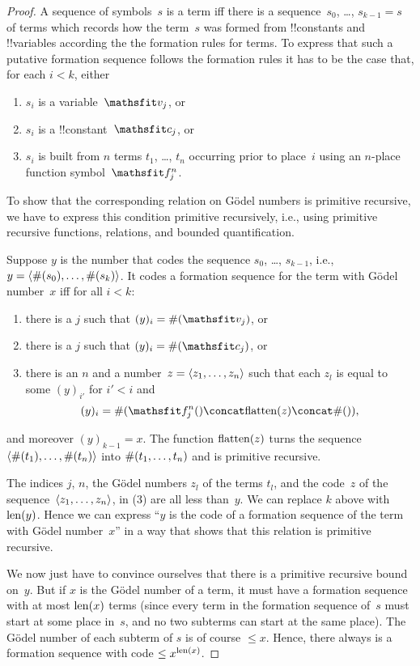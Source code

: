 \documentclass[../../include/open-logic-section]{subfiles}
\begin{document}
\begin{proof}
A sequence of symbols~$s$ is a term iff there is a sequence~$s_0$,
\dots, $s_{k-1} = s$ of terms which records how the term~$s$ was formed
from !!{constant}s and !!{variable}s according the the formation rules
for terms. To express that such a putative formation sequence follows
the formation rules it has to be the case that, for each $i < k$, either
\begin{enumerate}
\item $s_i$ is a variable~$\Obj v_j$, or
\item $s_i$ is a !!{constant}~$\Obj c_j$, or
\item $s_i$ is built from $n$ terms $t_1$, \dots, $t_n$ occurring
  prior to place~$i$ using an $n$-place function symbol~$\Obj f^n_j$.
\end{enumerate}
To show that the corresponding relation on G\"odel numbers is
primitive recursive, we have to express this condition primitive
recursively, i.e., using primitive recursive functions, relations, and
bounded quantification.

Suppose $y$ is the number that codes the sequence $s_0$, \dots, $s_{k-1}$,
i.e., $y = \langle \#(s_0), \dots, \#(s_k) \rangle$.  It codes a formation
sequence for the term with G\"odel number~$x$ iff for all $i < k$:
\begin{enumerate}
\item there is a $j$ such that $(y)_i = \Gn{\Obj v_j}$, or
\item there is a $j$ such that $(y)_i = \Gn{\Obj c_j}$, or
\item there is an $n$ and a number~$z = \langle z_1, \dots, z_n \rangle$ such
  that each $z_l$ is equal to some $(y)_{i'}$ for $i' < i$ and
\[
(y)_i = \Gn{\Obj f^n_j(} \concat \fn{flatten}(z) \concat \Gn{)},
\]
\end{enumerate}
and moreover $(y)_{k-1} = x$.  The function
$\mathrm{flatten}(z)$ turns the sequence $\langle \#(t_1), \dots,
  \#(t_n) \rangle$ into $\#(t_1, \dots, t_n)$ and is primitive recursive.

The indices $j$, $n$, the G\"odel numbers $z_l$ of the terms $t_l$,
and the code~$z$ of the sequence~$\langle z_1, \dots, z_n \rangle$, in (3) are
all less than~$y$. We can replace $k$ above with $\mathrm{len}(y)$. Hence we
can express ``$y$ is the code of a formation sequence of the term with
G\"odel number~$x$'' in a way that shows that this relation is
primitive recursive.

We now just have to convince ourselves that there is a primitive
recursive bound on~$y$.  But if $x$ is the G\"odel number of a term,
it must have a formation sequence with at most $\mathrm{len}(x)$ terms (since
every term in the formation sequence of~$s$ must start at some place
in~$s$, and no two subterms can start at the same place).  The G\"odel
number of each subterm of $s$ is of course $\le x$. Hence, there
always is a formation sequence with code $\le x^{\mathrm{len}(x)}$.
\end{proof}
\end{document}

